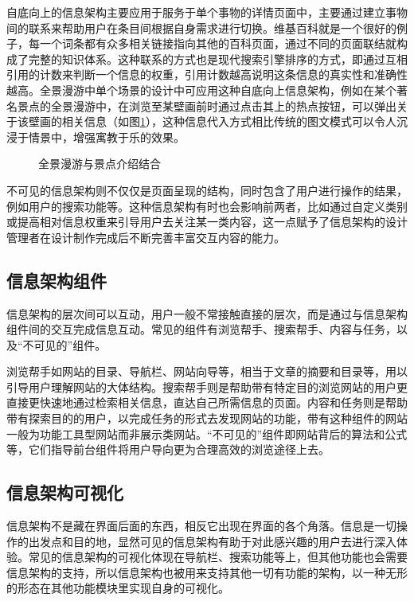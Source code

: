 自底向上的信息架构主要应用于服务于单个事物的详情页面中，主要通过建立事物间的联系来帮助用户在条目间根据自身需求进行切换。维基百科就是一个很好的例子，每一个词条都有众多相关链接指向其他的百科页面，通过不同的页面联结就构成了完整的知识体系。这种联系的方式也是现代搜索引擎排序的方式，即通过互相引用的计数来判断一个信息的权重，引用计数越高说明这条信息的真实性和准确性越高。全景漫游中单个场景的设计中可应用这种自底向上信息架构，例如在某个著名景点的全景漫游中，在浏览至某壁画前时通过点击其上的热点按钮，可以弹出关于该壁画的相关信息（如图\ref{fig:dunhuang}），这种信息代入方式相比传统的图文模式可以令人沉浸于情景中，增强寓教于乐的效果。

\begin{figure}[htp]
\centering
{}
\caption{全景漫游与景点介绍结合}
\label{fig:dunhuang}
\end{figure}

不可见的信息架构则不仅仅是页面呈现的结构，同时包含了用户进行操作的结果，例如用户的搜索功能等。这种信息架构有时也会影响前两者，比如通过自定义类别或提高相对信息权重来引导用户去关注某一类内容，这一点赋予了信息架构的设计管理者在设计制作完成后不断完善丰富交互内容的能力。

\subsection{信息架构组件}
信息架构的层次间可以互动，用户一般不常接触直接的层次，而是通过与信息架构组件间的交互完成信息互动。常见的组件有浏览帮手、搜索帮手、内容与任务，以及“不可见的”组件。

浏览帮手如网站的目录、导航栏、网站向导等，相当于文章的摘要和目录等，用以引导用户理解网站的大体结构。搜索帮手则是帮助带有特定目的浏览网站的用户更直接更快速地通过检索相关信息，直达自己所需信息的页面。内容和任务则是帮助带有探索目的的用户，以完成任务的形式去发现网站的功能，带有这种组件的网站一般为功能工具型网站而非展示类网站。“不可见的”组件即网站背后的算法和公式等，它们指导前台组件将用户导向更为合理高效的浏览途径上去。

\subsection{信息架构可视化}
信息架构不是藏在界面后面的东西，相反它出现在界面的各个角落。信息是一切操作的出发点和目的地，显然可见的信息架构有助于对此感兴趣的用户去进行深入体验。常见的信息架构的可视化体现在导航栏、搜索功能等上，但其他功能也会需要信息架构的支持，所以信息架构也被用来支持其他一切有功能的架构，以一种无形的形态在其他功能模块里实现自身的可视化。

